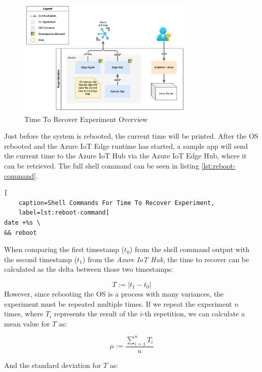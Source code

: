 \begin{figure}[H]
    \centering
    \includegraphics[width=0.75\textwidth]{fig/reboot-setup.drawio.png}
    \caption{Time To Recover Experiment Overview}
\end{figure}

\noindent
Just before the system is rebooted, the current time will be printed.
After the \ac{OS} rebooted and the Azure IoT Edge runtime has started, a
sample app will send the current time to the Azure IoT Hub via the Azure IoT Edge
Hub, where it can be retrieved. The full shell command can be seen in listing
\ref{lst:reboot-command}.
\\

\begin{lstlisting}[
    caption=Shell Commands For Time To Recover Experiment,
    label=lst:reboot-command]
date +%s \
&& reboot
\end{lstlisting}

\noindent
When comparing the first timestamp ($t_0$) from the shell command output with the second
timestamp ($t_1$) from the \textit{Azure IoT Hub}, the time to recover can be calculated
as the delta between those two timestamps:

\begin{equation}
    T := |t_1 - t_0|
\end{equation}
However, since rebooting the \ac{OS} is a process with many variances, the experiment
must be repeated multiple times. If we repeat the experiment $n$ times, where
$T_i$ represents the result of the $i$-th repetition, we can calculate
a mean value for $T$ as:

\begin{equation}
    \mu := \frac{\sum_{i=1}^{n}T_i}{n}
\end{equation}

\noindent
And the standard deviation for $T$ as:

